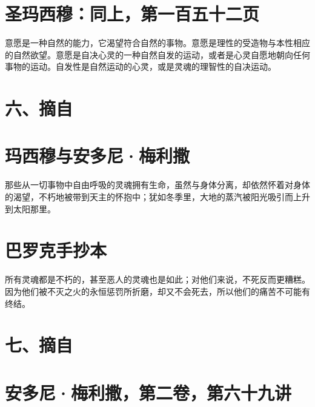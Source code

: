 \section{圣玛西穆：同上，第一百五十二页}

意愿是一种自然的能力，它渴望符合自然的事物。意愿是理性的受造物与本性相应的自然欲望。意愿是自决心灵的一种自然自发的运动，或者是心灵自愿地朝向任何事物的运动。自发性是自然运动的心灵，或是灵魂的理智性的自决运动。\par


\section{六、摘自}


\section{玛西穆与安多尼·梅利撒}

那些从一切事物中自由呼吸的灵魂拥有生命，虽然与身体分离，却依然怀着对身体的渴望，不朽地被带到天主的怀抱中；犹如冬季里，大地的蒸汽被阳光吸引而上升到太阳那里。\par


\section{巴罗克手抄本}

所有灵魂都是不朽的，甚至恶人的灵魂也是如此；对他们来说，不死反而更糟糕。因为他们被不灭之火的永恒惩罚所折磨，却又不会死去，所以他们的痛苦不可能有终结。\par


\section{七、摘自}


\section{安多尼·梅利撒，第二卷，第六十九讲}

